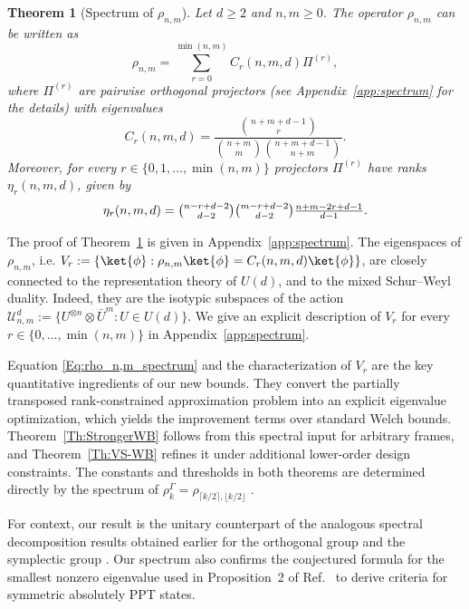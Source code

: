 \documentclass[aps,twocolumn,pra,superscriptaddress,nofootinbib]{revtex4-2}
\newtheorem{thm}{Theorem}
\newcommand{\sumab}[2]{\underset{#1}{\overset{#2}{\sum}}}
\begin{document}
\begin{thm}[Spectrum of $\rho_{n,m}$]\label{Th:Spec_rho_nm}
Let $d\ge 2$ and $n,m\ge 0$. The operator $\rho_{n,m}$ can be written as
\begin{equation}
\label{Eq:rho_n,m_spectrum}
\rho_{n,m} = \sumab{r=0}{\min(n,m)} C_{r}(n,m,d)\Pi^{(r)},
\end{equation}
where $\Pi^{(r)}$ are pairwise orthogonal projectors (see Appendix~\ref{app:spectrum} for the details) with eigenvalues
\begin{equation} \label{Eq:EigenvaluesFormula}
C_r(n,m,d) = \frac{\binom{n+m+d-1}{r}}{\binom{n+m}{m}\binom{n+m+d-1}{n+m}}.
\end{equation}
Moreover, for every $r\in\{0,1,\dotsc,\min(n,m)\}$ projectors $\Pi^{(r)}$ have ranks $\eta_r(n,m,d)$, given by
\begin{equation} \label{eq:eta}
\eta_r(n,m,d) = \tbinom{n-r+d-2}{d-2} \tbinom{m-r+d-2}{d-2} \tfrac{n+m-2r+d-1}{d-1}.
\end{equation} 
\end{thm}

The proof of Theorem~\ref{Th:Spec_rho_nm} is given in Appendix~\ref{app:spectrum}. The eigenspaces of $\rho_{n,m}$, i.e. $V_{r}:= \{ \ket{\phi}: \rho_{n,m}\ket{\phi}= C_r(n,m,d)\ket{\phi}\}$, are closely connected to the representation theory of $U(d)$, and to the mixed Schur--Weyl duality. Indeed, they are the isotypic subspaces of the action $\mathcal{U}_{n,m}^{d}:=\{U^{\otimes n}\otimes \bar{U}^{m}:U\in U(d)\}$. We give an explicit description of $V_{r}$ for every $r\in\{0,\dotsc,\min(n,m)\}$ in Appendix~\ref{app:spectrum}.


Equation \eqref{Eq:rho_n,m_spectrum} and the characterization of $V_{r}$ are the key quantitative ingredients of our new bounds. 
They convert the partially transposed rank-constrained approximation problem into an explicit eigenvalue optimization, which yields the improvement terms over standard Welch bounds. 
Theorem~\ref{Th:StrongerWB} follows from this spectral input for arbitrary frames, and Theorem~\ref{Th:VS-WB} refines it under additional lower-order design constraints. 
The constants and thresholds in both theorems are determined directly by the spectrum of $\rho_k^\mathsf{\Gamma} =\rho_{\lceil k/2\rceil,\lfloor k/2\rfloor}$ .



For context, our result is the unitary counterpart of the analogous spectral decomposition results obtained earlier for the orthogonal group \cite{schatzki2024orthogonal,nemoz2025orthogonal} and the symplectic group \cite{west2024symplectic}. {Our spectrum also confirms the conjectured formula for the smallest nonzero eigenvalue used in Proposition~2 of Ref.~\cite{abellanet2025sufficient} to derive criteria for symmetric absolutely PPT states.}
\end{document}
